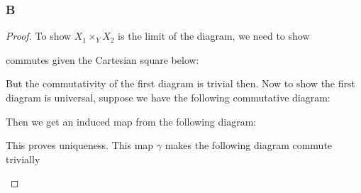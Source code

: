 \documentclass{article}
\begin{document}
\subsubsection{B}\label{1.4.B}
\begin{proof}
    To show $X_1\times_Y X_2$ is the limit of the diagram, we need to show
    \begin{center}
    \end{center}
    commutes given the Cartesian square below:
    \begin{center}
        \end{center}
        But the commutativity of the first diagram is trivial then. Now to show the first diagram is universal, suppose we have the following commutative diagram:
        \begin{center}
    \end{center}
Then we get an induced map from the following diagram:
\begin{center}
\end{center}
    This proves uniqueness. This map $\gamma$ makes the following diagram commute trivially
    \begin{center}
        \begin{tikzcd}

\end{tikzcd}
\end{center}
\end{proof}
\end{document}

